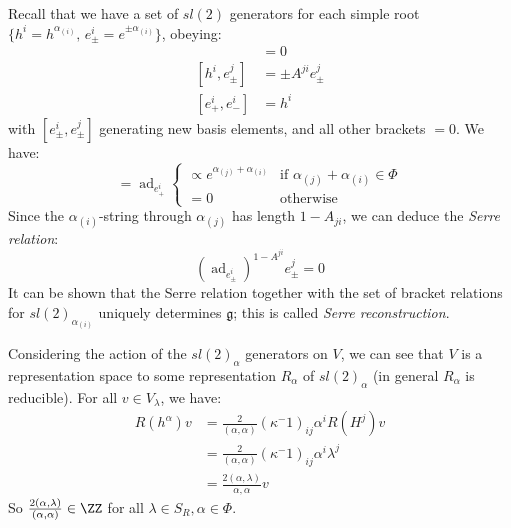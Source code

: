 \documentclass{jknotes}
\begin{document}
Recall that we have a set of \(sl(2)\) generators for each simple root \(\{h^i=h^{\alpha_{(i)}},\,e^i_\pm = e^{\pm\alpha_{(i)}}\}\), obeying:
\begin{align}
    [h^i,h^j] &= 0\\
    [h^i,e_\pm^j] &= \pm A^{ji}e^j_\pm \\
    [e^i_+,e^i_-] &= h^i
\end{align}
with \([e^i_\pm,e^j_\pm]\) generating new basis elements, and all other brackets \(=0\). We have:
\begin{equation}
    [e_+^i,e_+^j] = \operatorname{ad}_{e^i_+}
    \begin{cases}
        \propto e^{\alpha_{(j)}+\alpha_{(i)}} & \text{if } \alpha_{(j)}+\alpha_{(i)} \in \Phi \\
        = 0 & \text{otherwise}
    \end{cases}
\end{equation}
Since the \(\alpha_{(i)}\)-string through \(\alpha_{(j)}\) has length \(1-A_{ji}\), we can deduce the \emph{Serre relation}:
\begin{equation}
    ( \operatorname{ad}_{e_\pm^i} )^{1-A^{ji}}e_\pm^j = 0
\end{equation}
It can be shown that the Serre relation together with the set of bracket relations for \(sl(2)_{\alpha_{(i)}}\) uniquely determines \(\mathfrak{g}\); this is called \emph{Serre reconstruction}.

Considering the action of the \(sl(2)_\alpha\) generators on \(V\), we can see that \(V\) is a representation space to some representation \(R_\alpha\) of \(sl(2)_\alpha\) (in general \(R_\alpha\) is reducible). For all \(v \in V_\lambda\), we have:
\begin{align}
    R(h^\alpha)v &= \frac{2}{(\alpha,\alpha)}(\kappa^-1)_{ij}\alpha^iR(H^j)v \\
    &= \frac{2}{(\alpha,\alpha)}(\kappa^-1)_{ij}\alpha^i\lambda^j \\
    &= \frac{2(\alpha,\lambda)}{\alpha,\alpha} v
\end{align}
So \(\frac{2(\alpha,\lambda)}{(\alpha,\alpha)} \in \ZZ\) for all \(\lambda \in S_R, \alpha \in \Phi\).
\end{document}
